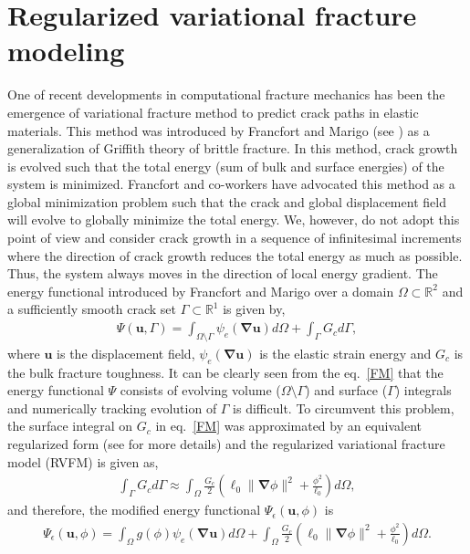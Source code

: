 \documentclass[11pt] {article}
\newcommand{\bs}[1] {\boldsymbol{#1}}
\begin{document}
\section{Regularized variational fracture modeling}
One of recent developments in computational fracture mechanics has been the emergence of variational fracture method to predict crack paths in elastic materials. This method was introduced by Francfort and Marigo (see \cite{francfort_1998}) as a generalization of Griffith theory of brittle fracture. In this method, crack growth is evolved such that the total energy (sum of bulk and surface energies) of the system is minimized. Francfort and co-workers have advocated this method as a global minimization problem such that the crack and global displacement field will evolve to globally minimize the total energy. We, however, do not adopt this point of view and consider crack growth in a sequence of infinitesimal increments where the direction of crack growth reduces the total energy as much as possible. Thus, the system always moves in the direction of local energy gradient. The energy functional introduced by Francfort and Marigo over a domain $\Omega \subset \mathbb{R}^2$ and a sufficiently smooth crack set $\Gamma \subset \mathbb{R}^1$ is given by,
\begin{align}\label{FM}
\Psi (\bs u, \Gamma) = \int_{\Omega \setminus \Gamma} \psi_e\left(\bs \nabla \bs u\right) d\Omega + \int_{\Gamma} G_c d\Gamma,
\end{align}
where $\bs{u}$ is the displacement field, $\psi_e\left(\bs \nabla \bs u\right)$ is the elastic strain energy and $G_c$ is the bulk fracture toughness. It can be clearly seen from the eq.~\eqref{FM} that the energy functional $\Psi$ consists of evolving volume ($\Omega \setminus \Gamma$) and surface ($\Gamma$) integrals and numerically tracking evolution of $\Gamma$ is difficult. To circumvent this problem, the surface integral on $G_c$ in eq.~\eqref{FM} was approximated by an equivalent regularized form (see \cite{bourdin_2000,miehe_2010,borden_2012} for more details) and the regularized variational fracture model (RVFM) is given as,
\begin{align}
\int_{\Gamma} G_c d\Gamma \approx \int_{\Omega}\frac{G_c}{2} \left(\ell_0\| \bs \nabla \phi \|^2 +\frac{\phi^2}{\ell_0}\right) d\Omega \nonumber,
\end{align}
and therefore, the modified energy functional $\Psi_\epsilon(\bs u, \phi)$ is
\begin{align}\label{PFM}
\Psi_\epsilon(\bs u, \phi) = \int_{\Omega}g(\phi) \psi_e\left(\bs \nabla \bs u\right) d\Omega + \int_{\Omega}\frac{G_c}{2} \left(\ell_0\| \bs \nabla \phi \|^2 +\frac{\phi^2}{\ell_0}\right) d\Omega.
\end{align}
\end{document}

